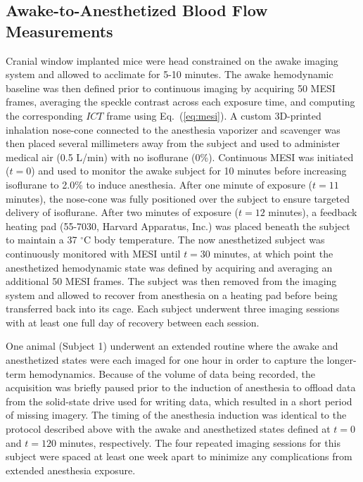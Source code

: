 \documentclass[review]{elsarticle}
\begin{document}

\subsection{Awake-to-Anesthetized Blood Flow Measurements}

Cranial window implanted mice were head constrained on the awake imaging system and allowed to acclimate for 5-10 minutes. The awake hemodynamic baseline was then defined prior to continuous imaging by acquiring 50 MESI frames, averaging the speckle contrast across each exposure time, and computing the corresponding $ICT$ frame using Eq.~(\ref{eq:mesi}). A custom 3D-printed inhalation nose-cone connected to the anesthesia vaporizer and scavenger was then placed several millimeters away from the subject and used to administer medical air (0.5 L/min) with no isoflurane (0\%). Continuous MESI was initiated ($t = 0$) and used to monitor the awake subject for 10 minutes before increasing isoflurane to 2.0\% to induce anesthesia. After one minute of exposure ($t = 11$ minutes), the nose-cone was fully positioned over the subject to ensure targeted delivery of isoflurane. After two minutes of exposure ($t = 12$ minutes), a feedback heating pad (55-7030, Harvard Apparatus, Inc.) was placed beneath the subject to maintain a 37 $^\circ$C body temperature. The now anesthetized subject was continuously monitored with MESI until $t = 30$ minutes, at which point the anesthetized hemodynamic state was defined by acquiring and averaging an additional 50 MESI frames. The subject was then removed from the imaging system and allowed to recover from anesthesia on a heating pad before being transferred back into its cage. Each subject underwent three imaging sessions with at least one full day of recovery between each session.

One animal (Subject 1) underwent an extended routine where the awake and anesthetized states were each imaged for one hour in order to capture the longer-term hemodynamics. Because of the volume of data being recorded, the acquisition was briefly paused prior to the induction of anesthesia to offload data from the solid-state drive used for writing data, which resulted in a short period of missing imagery. The timing of the anesthesia induction was identical to the protocol described above with the awake and anesthetized states defined at $t = 0$ and $t = 120$ minutes, respectively. The four repeated imaging sessions for this subject were spaced at least one week apart to minimize any complications from extended anesthesia exposure.
\end{document}
